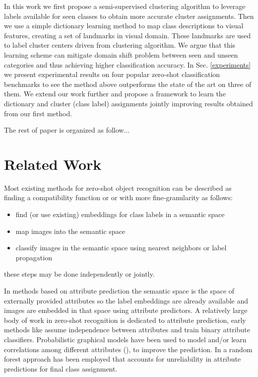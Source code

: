 \documentclass[wcp]{jmlr}
\begin{document}
 In this work
 we first propose a
  semi-supervised clustering algorithm to leverage labels available for seen classes to obtain more accurate cluster assignments.
 Then we use a simple dictionary learning method to map class descriptions to visual features, creating a set of landmarks in
 visual domain. These landmarks are used to label cluster centers driven from clustering algorithm. We argue that this learning
 scheme can mitigate domain shift problem \cite{eccv14} between seen and unseen categories and thus achieving higher classification accuracy.
In Sec. \ref{experiments} we present experimental results on four popular zero-shot classification benchmarks to see
the method above outperforms the state of the art on three of them.
 We extend our work further and propose a framework to learn the dictionary and cluster (class label) assignments jointly
 improving results obtained from our first method.

The rest of paper is organized as follow...
\section{Related Work}
Most existing methods for zero-shot object recognition can be described as finding a compatibility function or
or with more fine-granularity as follows:
\begin{itemize}
  \item find (or use existing) embeddings for class labels in a semantic space
  \item map images into the semantic space
  \item classify images in the semantic space using nearest neighbors or label propagation
\end{itemize}
these steps may be done independently or jointly.

In methods based on attribute prediction \cite{ziad} the semantic space is the space of externally provided attributes so the label embeddings are
already available and images are embedded in that space using attribute predictors. A relatively large body of work in zero-shot recognition is
dedicated to attribute prediction, early methods like \cite{lamplampert09} assume independence between attributes and train binary attribute classifiers.
Probabilistic graphical models have been used to model and/or learn correlations among different attributes (\cite{}), to improve the prediction.
In \cite{jayaraman14}  a random forest approach has been employed that accounts for unreliability in attribute predictions
 for final class assignment.
\end{document}
